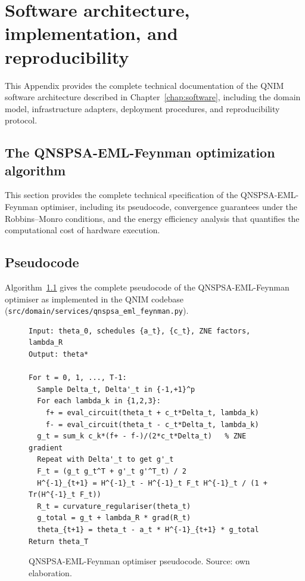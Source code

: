\documentclass[11pt,a4paper, english]{book}
\theoremstyle{plain}
\theoremstyle{definition}
\numberwithin{equation}{chapter}
\numberwithin{figure}{chapter}
\numberwithin{table}{chapter}
\begin{document}
\chapter{Software architecture, implementation, and reproducibility}
\label{app:software-architecture}

This Appendix provides the complete technical documentation of the QNIM
software architecture described in Chapter~\ref{chap:software}, including
the domain model, infrastructure adapters, deployment procedures, and
reproducibility protocol.

\section{The QNSPSA-EML-Feynman optimization algorithm}
\label{app:qnspsa}
\label{app:qnspsa-section}
This section provides the complete technical specification of the QNSPSA-EML-Feynman optimiser, including its pseudocode, convergence guarantees under the Robbins--Monro conditions, and the energy efficiency analysis that quantifies the computational cost of hardware execution.
\section{Pseudocode}
\label{app:qnspsa-pseudocode}

Algorithm~\ref{alg:qnspsa} gives the complete pseudocode of the
QNSPSA-EML-Feynman optimiser as implemented in the QNIM codebase
(\texttt{src/domain/services/qnspsa\_eml\_feynman.py}).

\begin{figure}[ht]
\begin{verbatim}
Input: theta_0, schedules {a_t}, {c_t}, ZNE factors, lambda_R
Output: theta*

For t = 0, 1, ..., T-1:
  Sample Delta_t, Delta'_t in {-1,+1}^p
  For each lambda_k in {1,2,3}:
    f+ = eval_circuit(theta_t + c_t*Delta_t, lambda_k)
    f- = eval_circuit(theta_t - c_t*Delta_t, lambda_k)
  g_t = sum_k c_k*(f+ - f-)/(2*c_t*Delta_t)   % ZNE gradient
  Repeat with Delta'_t to get g'_t
  F_t = (g_t g_t^T + g'_t g'^T_t) / 2
  H^{-1}_{t+1} = H^{-1}_t - H^{-1}_t F_t H^{-1}_t / (1 + Tr(H^{-1}_t F_t))
  R_t = curvature_regulariser(theta_t)
  g_total = g_t + lambda_R * grad(R_t)
  theta_{t+1} = theta_t - a_t * H^{-1}_{t+1} * g_total
Return theta_T
\end{verbatim}
\caption[QNSPSA-EML-Feynman optimiser pseudocode]{QNSPSA-EML-Feynman optimiser pseudocode. Source: own elaboration.} \label{alg:qnspsa}
\end{figure}
\end{document}

